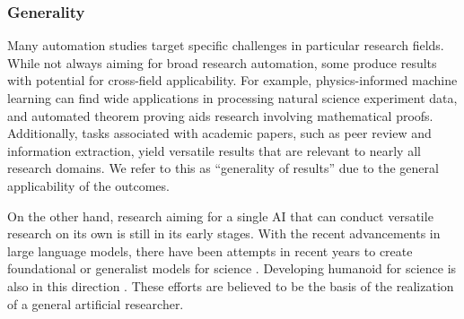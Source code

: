 \subsubsection{Generality}
Many automation studies target specific challenges in particular research fields. While not always aiming for broad research automation, some produce results with potential for cross-field applicability. For example, physics-informed machine learning can find wide applications in processing natural science experiment data, and automated theorem proving aids research involving mathematical proofs. Additionally, tasks associated with academic papers, such as peer review and information extraction, yield versatile results that are relevant to nearly all research domains. We refer to this as ``generality of results'' due to the general applicability of the outcomes.

On the other hand, research aiming for a single AI that can conduct versatile research on its own is still in its early stages. With the recent advancements in large language models, there have been attempts in recent years to create foundational or generalist models for science \cite{tu2023towards,taylor2022galactica}. Developing humanoid for science  is also in this direction \cite{yachie2017robotic}. These efforts are believed to be the basis of the realization of a general artificial researcher.



